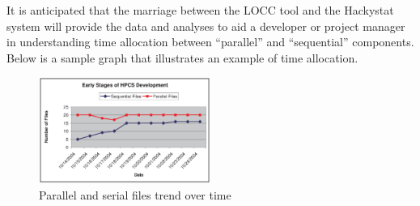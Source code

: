 \documentclass[11pt,twocolumn]{article}
\begin{document}
It is anticipated that the marriage between the LOCC tool and the
Hackystat system will provide the data and analyses to aid a developer
or project manager in understanding time allocation between
``parallel'' and ``sequential'' components.  Below is a sample graph
that illustrates an example of time allocation.

\begin{figure}[h]
  \includegraphics[width=0.5\textwidth]{DOP_ratio.eps}
  \caption{Parallel and serial files trend over time}
  \label{fig:DOPRatio}
\end{figure}
\pagebreak



\end{document}
